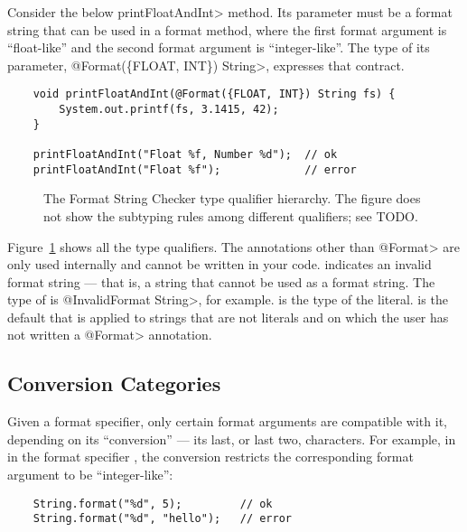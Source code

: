 Consider the below \<printFloatAndInt> method.  Its parameter must be a
format string that can be used in a format method, where the first format
argument is ``float-like'' and the second format argument is
``integer-like''.  The type of its parameter, \<@Format(\{FLOAT, INT\})
String>, expresses that contract.

\begin{Verbatim}
    void printFloatAndInt(@Format({FLOAT, INT}) String fs) {
        System.out.printf(fs, 3.1415, 42);
    } 

    printFloatAndInt("Float %f, Number %d");  // ok
    printFloatAndInt("Float %f");             // error
\end{Verbatim}

\begin{figure}[thbp]
\caption{The Format String Checker type qualifier hierarchy.  The figure
  does not show the subtyping rules among different 
  qualifiers; see TODO. }
\label{fig:formatter-hierarchy}
\end{figure}

Figure~\ref{fig:formatter-hierarchy} shows all the type qualifiers.
The annotations other than \<@Format> are only used
internally and cannot be written in your code.
 indicates an invalid format
string --- that is, a string that cannot be used as a format string.  The
type of  is \<@InvalidFormat String>, for example.
 is the type of the
 literal.
 is the default that is
applied to strings that are not literals and on which the user has not
written a \<@Format> annotation.

\subsection{Conversion Categories\label{formatter-categories}}

Given a format specifier, only certain format arguments are compatible with
it, depending on its ``conversion'' --- its last, or last two,
characters.  For example, in in the format specifier , the
conversion  restricts the corresponding format argument
to be ``integer-like'':

\begin{Verbatim}
    String.format("%d", 5);         // ok
    String.format("%d", "hello");   // error
\end{Verbatim}

